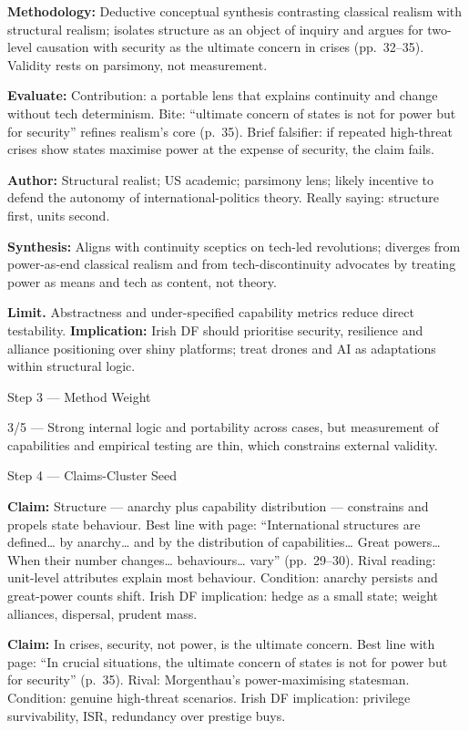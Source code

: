\textbf{Methodology:} Deductive conceptual synthesis contrasting classical realism with structural realism; isolates structure as an object of inquiry and argues for two-level causation with security as the ultimate concern in crises (pp.~32–35). Validity rests on parsimony, not measurement.

\textbf{Evaluate:} Contribution: a portable lens that explains continuity and change without tech determinism. Bite: “ultimate concern of states is not for power but for security” refines realism’s core (p.~35). Brief falsifier: if repeated high-threat crises show states maximise power at the expense of security, the claim fails.

\textbf{Author:} Structural realist; US academic; parsimony lens; likely incentive to defend the autonomy of international-politics theory. Really saying: structure first, units second.

\textbf{Synthesis:} Aligns with continuity sceptics on tech-led revolutions; diverges from power-as-end classical realism and from tech-discontinuity advocates by treating power as means and tech as content, not theory.

\textbf{Limit.} Abstractness and under-specified capability metrics reduce direct testability. \textbf{Implication:} Irish DF should prioritise security, resilience and alliance positioning over shiny platforms; treat drones and AI as adaptations within structural logic.

Step 3 — Method Weight

3/5 — Strong internal logic and portability across cases, but measurement of capabilities and empirical testing are thin, which constrains external validity.

Step 4 — Claims-Cluster Seed

\textbf{Claim:} Structure — anarchy plus capability distribution — constrains and propels state behaviour.
Best line with page: “International structures are defined… by anarchy… and by the distribution of capabilities… Great powers… When their number changes… behaviours… vary” (pp.~29–30). Rival reading: unit-level attributes explain most behaviour. Condition: anarchy persists and great-power counts shift. Irish DF implication: hedge as a small state; weight alliances, dispersal, prudent mass.

\textbf{Claim:} In crises, security, not power, is the ultimate concern.
Best line with page: “In crucial situations, the ultimate concern of states is not for power but for security” (p.~35). Rival: Morgenthau’s power-maximising statesman. Condition: genuine high-threat scenarios. Irish DF implication: privilege survivability, ISR, redundancy over prestige buys.

